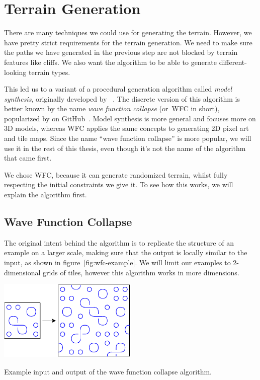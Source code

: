 \section{Terrain Generation}\label{sec:analysis-terrain-generation}

There are many techniques we could use for generating the terrain.
However, we have pretty strict requirements for the terrain generation.
We need to make sure the paths we have generated in the previous step are not blocked by terrain features like cliffs.
We also want the algorithm to be able to generate different-looking terrain types.

This led us to a variant of a procedural generation algorithm called \emph{model synthesis}, originally developed by ~\cite{ModelSynthesis}.
The discrete version of this algorithm is better known by the name \emph{wave function collapse} (or~WFC in short), popularized by  on GitHub~\cite{WFC}.
Model synthesis is more general and focuses more on 3D models, whereas WFC applies the same concepts to generating 2D pixel art and tile maps.
Since the name \enquote{wave function collapse} is more popular, we will use it in the rest of this thesis, even though it's not the name of the algorithm that came first.

We chose WFC, because it can generate randomized terrain, whilst fully respecting the initial constraints we give it.
To see how this works, we will explain the algorithm first.

\subsection{Wave Function Collapse}

The original intent behind the algorithm is to replicate the structure of an example on a larger scale, making sure that the output is locally similar to the input, as shown in figure~\ref{fig:wfc-example}.
We will limit our examples to 2-dimensional grids of tiles, however this algorithm works in more dimensions.

\begin{center}
    \captionsetup{type=figure}
    \includegraphics[width=0.5\textwidth]{img/WFC Example.pdf}
    \caption{Example input and output of the wave function collapse algorithm.}
    \label{fig:wfc-example}
\end{center}


